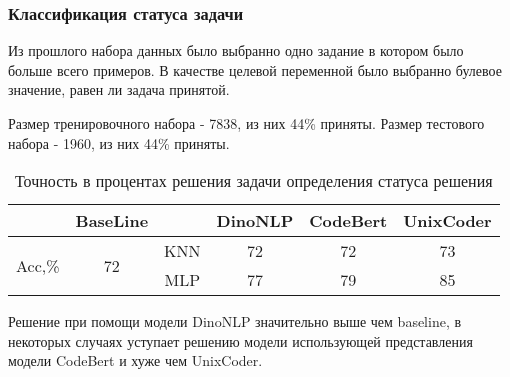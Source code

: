 \documentclass[../part_3.tex]{subfiles}
\begin{document}
\subsubsection{Классификация статуса задачи}
\par Из прошлого набора данных было выбранно одно задание в котором было больше всего примеров. В качестве целевой переменной было выбранно булевое значение, равен ли задача принятой. 
\par Размер тренировочного набора - 7838, из них 44\% приняты. Размер тестового набора - 1960, из них 44\% приняты. 
\begin{table}[H]
    \centering
    \begin{tabular}{|c|c||c|c|c|c|}\hline 
        &BaseLine&&DinoNLP&CodeBert&UnixCoder\\ \hline 
        \multirow{2}{*}{Acc,\%}&\multirow{2}{*}{72}&KNN&72&72&73\\\cline{3-6}
        &&MLP&77&79&85\\\hline
    \end{tabular}    
    \caption{Точность в процентах решения задачи определения статуса решения}
\end{table}
\par Решение при помощи модели DinoNLP значительно выше чем baseline, в некоторых случаях уступает решению модели использующей представления модели CodeBert и хуже чем UnixCoder.
\end{document}
